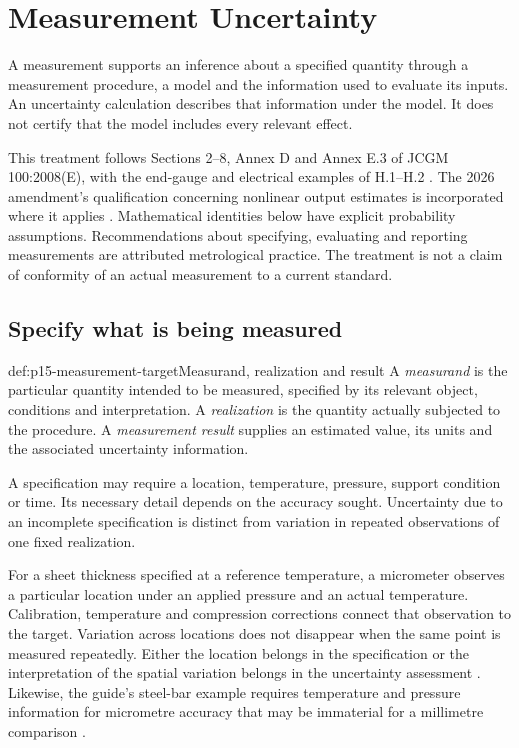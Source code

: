 \chapter{Measurement Uncertainty}
\label{sec:p15-measurement-uncertainty}

A measurement supports an inference about a specified quantity through a
measurement procedure, a model and the information used to evaluate its
inputs. An uncertainty calculation describes that information under the
model. It does not certify that the model includes every relevant effect.

This treatment follows Sections 2--8, Annex D and Annex E.3 of
JCGM 100:2008(E), with the end-gauge and electrical examples of H.1--H.2
\cite{JCGM1002008EMeasurement}. The 2026 amendment's qualification concerning
nonlinear output estimates is incorporated where it applies
\cite{JCGM100Amendment2026Nonlinearity}. Mathematical identities below have
explicit probability assumptions. Recommendations about specifying,
evaluating and reporting measurements are attributed metrological practice.
The treatment is not a claim of conformity of an actual measurement to a
current standard.

\section{Specify what is being measured}
\label{sec:p15-measurement-target}

\begin{hbdefinition}{def:p15-measurement-target}{Measurand, realization and result}
A \emph{measurand} is the particular quantity intended to be measured,
specified by its relevant object, conditions and interpretation. A
\emph{realization} is the quantity actually subjected to the procedure.
A \emph{measurement result} supplies an estimated value, its units and the
associated uncertainty information.

A specification may require a location, temperature, pressure, support
condition or time. Its necessary detail depends on the accuracy sought.
Uncertainty due to an incomplete specification is distinct from variation in
repeated observations of one fixed realization.
\end{hbdefinition}

For a sheet thickness specified at a reference temperature, a micrometer
observes a particular location under an applied pressure and an actual
temperature. Calibration, temperature and compression corrections connect
that observation to the target. Variation across locations does not disappear
when the same point is measured repeatedly. Either the location belongs in the
specification or the interpretation of the spatial variation belongs in the
uncertainty assessment \cite[Annex D.1--D.5]{JCGM1002008EMeasurement}.
Likewise, the guide's steel-bar example requires temperature and pressure
information for micrometre accuracy that may be immaterial for a millimetre
comparison \cite[3.1.3]{JCGM1002008EMeasurement}.

